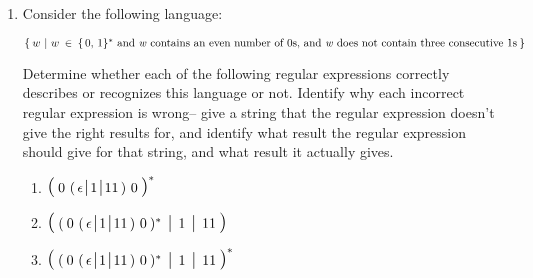 \documentclass[11pt]{article}
\begin{document}
\begin{enumerate}
\begin{multicols}{2}
\begin{enumerate}
              \item $ \{ \: w\ | \ aaa \ \textrm{is a substring of} \ w\: \} $

              \item $ \{ \: w\ | \ aaa \ \mathrm{is} \ {\bf not}
                      \ \textrm{a substring of} \ w \: \} $

            \end{enumerate}

          \end{multicols}

    \item Consider the following language:

          $ \{ \: w \ | \ w \: \in \: \{ \, 0, \, 1 \}^* \
                        \textrm{and \textit{w} contains an even number of
                                0s, and \textit{w} does not contain three
                                consecutive 1s} \: \} $

          Determine whether each of the following regular expressions
          correctly describes or recognizes this language or not.  Identify
          why each incorrect regular expression is wrong-- give a string
          that the regular expression doesn't give the right results for,
          and identify what result the regular expression should give for
          that string, and what result it actually gives.

          \begin{enumerate}

            \newcommand{\sss}{\hspace{.35mm}}
            \newcommand{\mymid}{\mbox{\large \ensuremath{\sss\mid\sss}}}
            \newcommand{\stuff}{\ensuremath{
                                  ( \, \epsilon \mymid 1 \mymid 11 \, )
                                }}

            \addtolength{\itemsep}{2mm}

            \item \(
                    \lpar \: 0 \ \stuff \ 0 \: \rpar^*
                  \)

            \item \(
                    \lpar \:
                      ( \: 0 \ \stuff \ 0 \: )^* \
                      \mymid \ 1 \
                      \mymid \ 11 \:
                    \rpar
                  \)

            \item \(
                    \lpar \:
                      ( \: 0 \ \stuff \ 0 \: )^* \
                      \mymid \ 1 \
                      \mymid \ 11 \:
                    \rpar^*
                  \)


\end{enumerate}
\end{enumerate}
\end{document}
